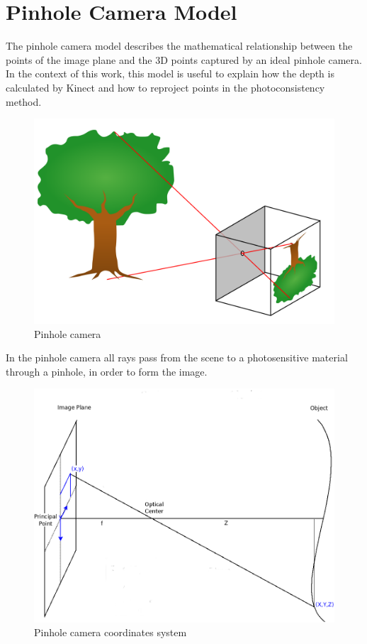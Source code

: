 
\section{Pinhole Camera Model}

The pinhole camera model describes the mathematical relationship between the points of the image plane and the 3D points captured by an 
ideal pinhole camera. In the context of this work, this model is useful to explain how the depth is calculated by Kinect and 
how to reproject points in the photoconsistency method.

\begin{figure}[H]
\begin{center}
\includegraphics[scale=0.15]{images/pinhole-camera}
\caption{Pinhole camera}
\label{fig:pinhole}
\end{center}
\end{figure}

In the pinhole camera all rays pass from the scene to a photosensitive material through a pinhole, in order to form the image.

\begin{figure}[H]
\begin{center}
\includegraphics[scale=1]{images/pinhole-coordinates}
\caption{Pinhole camera coordinates system}
\label{fig:pinhole-c}
\end{center}
\end{figure}

